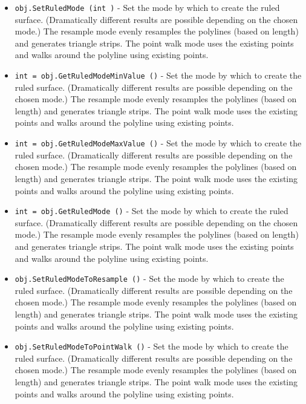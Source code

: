 \begin{itemize}
\item  \verb|obj.SetRuledMode (int )| -  Set the mode by which to create the ruled surface. (Dramatically
 different results are possible depending on the chosen mode.) The
 resample mode evenly resamples the polylines (based on length) and 
 generates triangle strips. The point walk mode uses the existing
 points and walks around the polyline using existing points.

\item  \verb|int = obj.GetRuledModeMinValue ()| -  Set the mode by which to create the ruled surface. (Dramatically
 different results are possible depending on the chosen mode.) The
 resample mode evenly resamples the polylines (based on length) and 
 generates triangle strips. The point walk mode uses the existing
 points and walks around the polyline using existing points.

\item  \verb|int = obj.GetRuledModeMaxValue ()| -  Set the mode by which to create the ruled surface. (Dramatically
 different results are possible depending on the chosen mode.) The
 resample mode evenly resamples the polylines (based on length) and 
 generates triangle strips. The point walk mode uses the existing
 points and walks around the polyline using existing points.

\item  \verb|int = obj.GetRuledMode ()| -  Set the mode by which to create the ruled surface. (Dramatically
 different results are possible depending on the chosen mode.) The
 resample mode evenly resamples the polylines (based on length) and 
 generates triangle strips. The point walk mode uses the existing
 points and walks around the polyline using existing points.

\item  \verb|obj.SetRuledModeToResample ()| -  Set the mode by which to create the ruled surface. (Dramatically
 different results are possible depending on the chosen mode.) The
 resample mode evenly resamples the polylines (based on length) and 
 generates triangle strips. The point walk mode uses the existing
 points and walks around the polyline using existing points.

\item  \verb|obj.SetRuledModeToPointWalk ()| -  Set the mode by which to create the ruled surface. (Dramatically
 different results are possible depending on the chosen mode.) The
 resample mode evenly resamples the polylines (based on length) and 
 generates triangle strips. The point walk mode uses the existing
 points and walks around the polyline using existing points.


\end{itemize}
